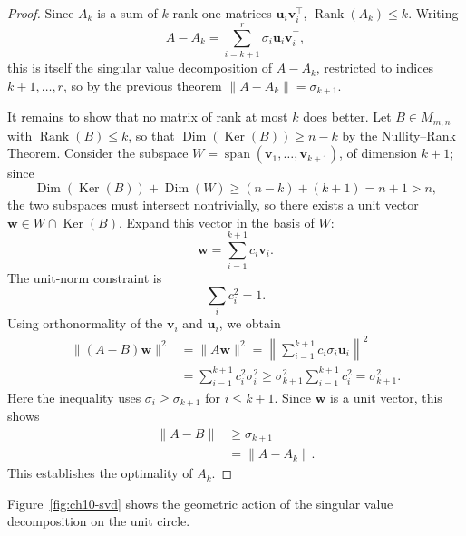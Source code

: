 \begin{proof}
Since $A_k$ is a sum of $k$ rank-one matrices $\mathbf{u}_i\mathbf{v}_i^{\top}$, $\operatorname{Rank}(A_k) \leq k$. Writing \[
A - A_k = \sum_{i=k+1}^{r} \sigma_i \mathbf{u}_i \mathbf{v}_i^{\top},
\] this is itself the singular value decomposition of $A-A_k$, restricted to indices $k+1, \dots, r$, so by the previous theorem $\|A - A_k\| = \sigma_{k+1}$.

It remains to show that no matrix of rank at most $k$ does better. Let $B \in M_{m,n}$ with $\operatorname{Rank}(B) \leq k$, so that $\operatorname{Dim}(\operatorname{Ker}(B)) \geq n-k$ by the Nullity--Rank Theorem. Consider the subspace $W = \operatorname{span}(\mathbf{v}_1, \dots, \mathbf{v}_{k+1})$, of dimension $k+1$; since
\[
\operatorname{Dim}(\operatorname{Ker}(B)) + \operatorname{Dim}(W) \geq (n-k) + (k+1) = n+1 > n,
\] the two subspaces must intersect nontrivially, so there exists a unit vector $\mathbf{w} \in W \cap \operatorname{Ker}(B)$. Expand this vector in the basis of $W$:
\[
\mathbf{w} = \sum_{i=1}^{k+1} c_i \mathbf{v}_i.
\]
The unit-norm constraint is
\[
\sum_i c_i^2 = 1.
\]
Using orthonormality of the $\mathbf{v}_i$ and $\mathbf{u}_i$, we obtain
\[
\begin{aligned}
\|(A-B)\mathbf{w}\|^2
&= \|A\mathbf{w}\|^2
= \left\| \sum_{i=1}^{k+1} c_i \sigma_i \mathbf{u}_i \right\|^2 \\
&= \sum_{i=1}^{k+1} c_i^2 \sigma_i^2
\geq \sigma_{k+1}^2 \sum_{i=1}^{k+1} c_i^2
= \sigma_{k+1}^2.
\end{aligned}
\]
Here the inequality uses $\sigma_i \geq \sigma_{k+1}$ for $i \leq k+1$. Since $\mathbf{w}$ is a unit vector, this shows
\[
\begin{aligned}
\|A-B\| &\geq \sigma_{k+1} \\
&= \|A-A_k\|.
\end{aligned}
\]
This establishes the optimality of $A_k$.
\end{proof}

Figure~\ref{fig:ch10-svd} shows the geometric action of the singular value decomposition on the unit circle.

